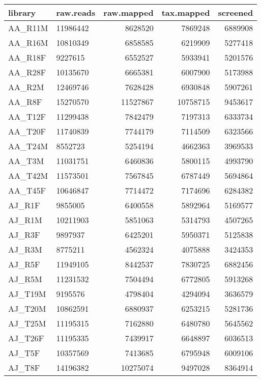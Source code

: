 \documentclass[10pt]{bmc_article}
\newenvironment{bmcformat}{\begin{raggedright}\baselineskip20pt\sloppy\setboolean{publ}{false}}{\end{raggedright}\baselineskip20pt\sloppy}
\begin{document}
\begin{bmcformat}
\begin{table}[ht]
\begin{center}
\begin{tabular}{llrrr}
  \hline
library & raw.reads & raw.mapped & tax.mapped & screened \\ 
  \hline
AA\_R11M & 11986442 & 8628520 & 7869248 & 6889908 \\ 
  AA\_R16M & 10810349 & 6858585 & 6219909 & 5277418 \\ 
  AA\_R18F & 9227615 & 6552527 & 5933941 & 5201576 \\ 
  AA\_R28F & 10135670 & 6665381 & 6007900 & 5173988 \\ 
  AA\_R2M & 12469746 & 7628428 & 6930848 & 5907261 \\ 
  AA\_R8F & 15270570 & 11527867 & 10758715 & 9453617 \\ 
  AA\_T12F & 11299438 & 7842479 & 7197313 & 6333734 \\ 
  AA\_T20F & 11740839 & 7744179 & 7114509 & 6323566 \\ 
  AA\_T24M & 8552723 & 5254194 & 4662363 & 3969533 \\ 
  AA\_T3M & 11031751 & 6460836 & 5800115 & 4993790 \\ 
  AA\_T42M & 11573501 & 7567845 & 6787449 & 5694864 \\ 
  AA\_T45F & 10646847 & 7714472 & 7174696 & 6284382 \\ 
  AJ\_R1F & 9855005 & 6400558 & 5892964 & 5169577 \\ 
  AJ\_R1M & 10211903 & 5851063 & 5314793 & 4507265 \\ 
  AJ\_R3F & 9897937 & 6425201 & 5950371 & 5125838 \\ 
  AJ\_R3M & 8775211 & 4562324 & 4075888 & 3424353 \\ 
  AJ\_R5F & 11949105 & 8442537 & 7830725 & 6882456 \\ 
  AJ\_R5M & 11231532 & 7504494 & 6772805 & 5913268 \\ 
  AJ\_T19M & 9195576 & 4798404 & 4294094 & 3636579 \\ 
  AJ\_T20M & 10862591 & 6880937 & 6253215 & 5281736 \\ 
  AJ\_T25M & 11195315 & 7162880 & 6480780 & 5645562 \\ 
  AJ\_T26F & 11195335 & 7439917 & 6648897 & 6036513 \\ 
  AJ\_T5F & 10357569 & 7413685 & 6795948 & 6009106 \\ 
  AJ\_T8F & 14196382 & 10275074 & 9497028 & 8364914 \\ 
   \hline
\end{tabular}
\end{center}
\end{table}



\end{bmcformat}
\end{document}
